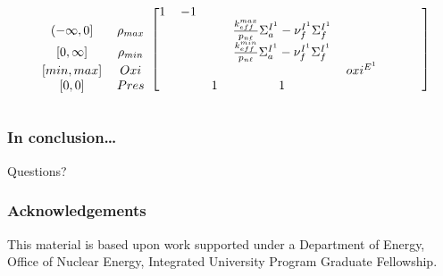 \documentclass{beamer}
\begin{document}
\begin{frame}
\begin{equation*}
\begin{blockarray}{cccccccccc}
\begin{block}{cc[cccccccc]}
                               &                   & 1                 &
            -1 \\
            {(-\infty,0]}      & \rho_{max}        &                   &
                               &                   &
            \frac{k_{eff}^{max}}{p_{n\ell}}\Sigma_{a}^{I^{1}} -
            \nu_{f}^{I^{1}}\Sigma_{f}^{I^{1}}                          &
             \\
            {[0,\infty]}       & \rho_{min}        &                   &
                               &                   &
            \frac{k_{eff}^{min}}{p_{n\ell}}\Sigma_{a}^{I^{1}} -
            \nu_{f}^{I^{1}}\Sigma_{f}^{I^{1}}                          &
             \\
            {[min,max]}        & Oxi               &                   &
                               &                   &                   &
            oxi^{E^{1}}        &                   &                   &
             \\
            {[0,0]}            & Pres              &                   &
                               & 1                 & 1                 &
             \\
            \end{block}
        \end{blockarray}
    \end{equation*}

\end{frame}




























\begin{frame}
\frametitle{In conclusion\ldots}

    Questions?

\end{frame}

\begin{frame}
\frametitle{Acknowledgements}

    This material is based upon work supported under a Department of Energy,
    Office of Nuclear Energy, Integrated University Program Graduate Fellowship.

\end{frame}
\end{document}
